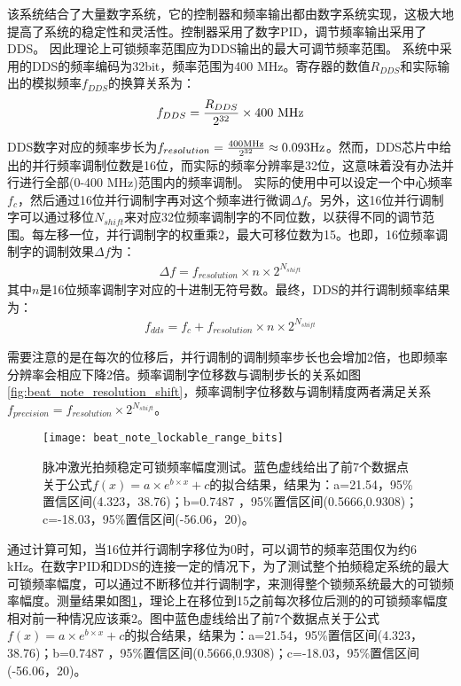该系统结合了大量数字系统，它的控制器和频率输出都由数字系统实现，这极大地提高了系统的稳定性和灵活性。控制器采用了数字PID，调节频率输出采用了DDS。
因此理论上可锁频率范围应为DDS输出的最大可调节频率范围。
系统中采用的DDS的频率编码为32bit，频率范围为400 MHz。寄存器的数值$R_{DDS}$和实际输出的模拟频率$f_{DDS}$的换算关系为：
\begin{align}
    f_{DDS}=\frac{R_{DDS}}{2^{32}}\times 400\ \textnormal{MHz}
\end{align}

DDS数字对应的频率步长为$f_{resolution}=\frac{400\textnormal{MHz}}{2^{32}}\approx0.093\textnormal{Hz}$。然而，DDS芯片中给出的并行频率调制位数是16位，而实际的频率分辨率是32位，这意味着没有办法并行进行全部(0-400 MHz)范围内的频率调制。
实际的使用中可以设定一个中心频率$f_{c}$，然后通过16位并行调制字再对这个频率进行微调$\Delta f$。另外，这16位并行调制字可以通过移位$N_{shift}$来对应32位频率调制字的不同位数，以获得不同的调节范围。每左移一位，并行调制字的权重乘2，最大可移位数为15。也即，16位频率调制字的调制效果$\Delta f$为：
\begin{align}
    \Delta f=f_{resolution}\times n \times 2^{N_{shift}}
\end{align}
其中$n$是16位频率调制字对应的十进制无符号数。最终，DDS的并行调制频率结果为：
\begin{align}
    f_{dds}=f_c+f_{resolution}\times n \times 2^{N_{shift}}
\end{align}


需要注意的是在每次的位移后，并行调制的调制频率步长也会增加2倍，也即频率分辨率会相应下降2倍。频率调制字位移数与调制步长的关系如图\ref{fig:beat_note_resolution_shift}，频率调制字位移数与调制精度两者满足关系$f_{precision}=f_{resolution}\times2^{N_{shift}}$。



\begin{figure}
    \centering
    \texttt{[image: beat\_note\_lockable\_range\_bits]}
    \caption[脉冲激光拍频稳定可锁频率幅度测试]{脉冲激光拍频稳定可锁频率幅度测试。蓝色虚线给出了前7个数据点关于公式$f(x)=a\times e^{b\times x}+c$的拟合结果，结果为：a=21.54，95\%置信区间(4.323，38.76)；b=0.7487 ，95\%置信区间(0.5666,0.9308)；c=-18.03，95\%置信区间(-56.06，20)。\label{fig:beat_note_lockable_range_bits}}
\end{figure}


通过计算可知，当16位并行调制字移位为0时，可以调节的频率范围仅为约6 kHz。在数字PID和DDS的连接一定的情况下，为了测试整个拍频稳定系统的最大可锁频率幅度，可以通过不断移位并行调制字，来测得整个锁频系统最大的可锁频率幅度。测量结果如图\ref{fig:beat_note_lockable_range_bits}，理论上在移位到15之前每次移位后测的的可锁频率幅度相对前一种情况应该乘2。图中蓝色虚线给出了前7个数据点关于公式$f(x)=a\times e^{b\times x}+c$的拟合结果，结果为：a=21.54，95\%置信区间(4.323，38.76)；b=0.7487 ，95\%置信区间(0.5666,0.9308)；c=-18.03，95\%置信区间(-56.06，20)。

